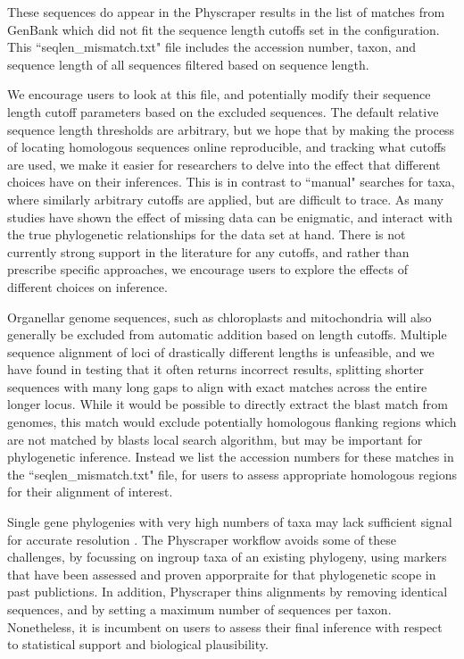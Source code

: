 \documentclass{bmcart}
\begin{document}
These sequences do appear in the Physcraper results in the list of matches from GenBank which did not fit the sequence length cutoffs set in the configuration.
This ``seqlen\_mismatch.txt" file includes the accession number, taxon, and sequence length of all sequences filtered based on sequence length.

We encourage users to look at this file, and potentially modify their sequence length cutoff parameters based on the excluded sequences.
The default relative sequence length thresholds are arbitrary, but we hope that by making the process of locating homologous sequences online reproducible, and tracking what cutoffs are used, we make it easier for researchers to delve into the effect that different choices have on their inferences.
This is in contrast to ``manual" searches for taxa, where similarly arbitrary cutoffs are applied, but are difficult to trace.
As many studies have shown \cite{huang_what_2009} the effect of missing data can be enigmatic, and interact with the true phylogenetic relationships for the data set at hand.
There is not currently strong support in the literature for any cutoffs, and rather than prescribe specific approaches, we encourage users to explore the effects of different choices on inference.

Organellar genome sequences, such as chloroplasts and mitochondria will also generally be excluded from automatic addition based on length cutoffs.
Multiple sequence alignment of loci of drastically different lengths is unfeasible, and we have found in testing that it often returns incorrect results, splitting shorter sequences with many long gaps to align with exact matches across the entire longer locus.
While it would be possible to directly extract the blast match from genomes, this match would exclude potentially homologous flanking regions which are not matched by blasts local search algorithm, but may be important for phylogenetic inference.
Instead we list the accession numbers for these matches in the ``seqlen\_mismatch.txt" file, for users to assess appropriate homologous regions for their alignment of interest.


Single gene phylogenies with very high numbers of taxa may lack sufficient signal for accurate resolution \cite{morel_phylogenetic_2020}.
The Physcraper workflow avoids some of these challenges, by focussing on ingroup taxa of an existing phylogeny, using markers that have been assessed and proven apporpraite for that phylogenetic scope in past publictions.
In addition, Physcraper thins alignments by removing identical sequences, and by setting a maximum number of sequences per taxon.
Nonetheless, it is incumbent on users to assess their final inference with respect to statistical support and biological plausibility.
\end{document}
